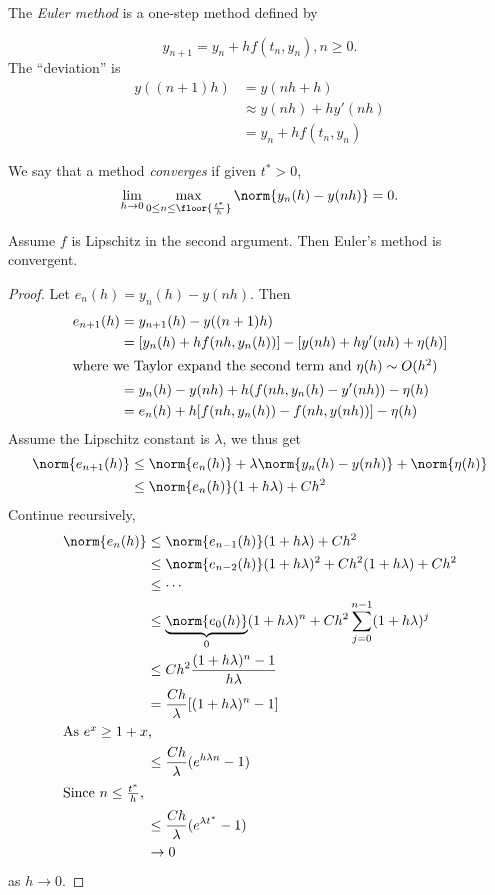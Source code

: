\documentclass[a4paper]{article}
\begin{document}
The \emph{Euler method} is a one-step method defined by

\[
  y_{n + 1} = y_n + hf(t_n, y_n), n \geq 0.
\]
The ``deviation'' is
\begin{align*}
  y((n + 1)h)
  &= y(nh + h) \\
  &\approx y(nh) + hy'(nh) \\
  &= y_n + hf(t_n, y_n)
\end{align*}

\begin{definition}
  We say that a method \emph{converges} if given \(t^* > 0\),
  \[
    \lim_{h \to 0} \max_{0 \leq n \leq \floor{\frac{t^*}{h}}} \norm{y_n(h) - y(nh)} = 0.
  \]
\end{definition}

\begin{theorem}
  Assume \(f\) is Lipschitz in the second argument. Then Euler's method is convergent.
\end{theorem}

\begin{proof}
  Let \(e_n(h) = y_n(h) - y(nh)\). Then
  \begin{align*}
    e_{n + 1}(h)
    &= y_{n + 1}(h) - y((n + 1)h) \\
    &= [y_n(h) + h f(nh, y_n(h))] - [y(nh) + hy'(nh) + \eta(h)] \\
    \intertext{where we Taylor expand the second term and \(\eta(h) \sim O(h^2)\)}
    &= y_n(h) - y(nh) + h(f(nh, y_n(h) - y'(nh)) - \eta(h) \\
    &= e_n(h) + h[f(nh, y_n(h)) - f(nh, y(nh))] - \eta(h)
  \end{align*}
  Assume the Lipschitz constant is \(\lambda\), we thus get
  \begin{align*}
    \norm{e_{n + 1}(h)}
    &\leq \norm{e_n(h)} + \lambda \norm{y_n(h) - y(nh)} + \norm{\eta(h)} \\
    &\leq \norm{e_n(h)}(1 + h\lambda) + Ch^2
  \end{align*}
  Continue recursively,
  \begin{align*}
    \norm{e_n(h)}
    &\leq \norm{e_{n - 1}(h)}(1 + h\lambda) + Ch^2 \\
    &\leq \norm{e_{n - 2}(h)}(1 + h\lambda)^2 + Ch^2(1 + h\lambda) + Ch^2 \\
    &\leq \cdots \\
    &\leq \underbrace{\norm{e_0(h)}}_0 (1 + h\lambda)^n + Ch^2 \sum_{j = 0}^{n - 1} (1 + h\lambda)^j \\
    &\leq Ch^2 \frac{(1 + h\lambda)^n - 1}{h\lambda} \\
    &= \frac{Ch}{\lambda} [(1 + h\lambda)^n - 1] \\
    \intertext{As \(e^x \geq 1 + x\),}
    &\leq \frac{Ch}{\lambda} (e^{h\lambda n} - 1) \\
    \intertext{Since \(n \leq \frac{t^*}{h}\),}
    &\leq \frac{Ch}{\lambda}(e^{\lambda t^*} - 1) \\
    &\to 0
  \end{align*}
  as \(h \to 0\).
\end{proof}









\printindex

\iffalse
http://damtp.cam.ac.uk/user/hf323/L18-IB-NA/
\fi
\end{document}
